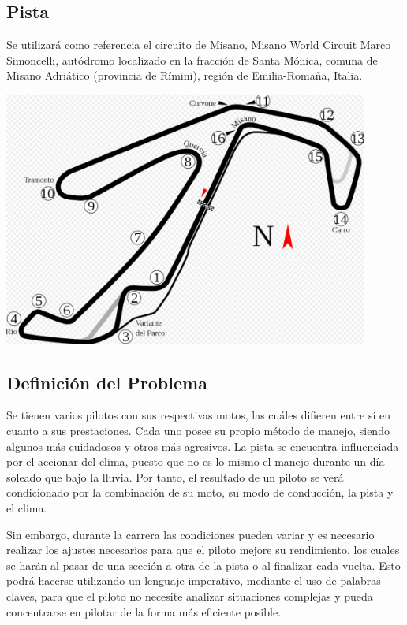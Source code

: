 \documentclass[12pt, letterpaper,spanish]{article}
\theoremstyle{definition}
\theoremstyle{remark}
\begin{document}
	\subsection{Pista}
	Se utilizará como referencia el circuito de Misano, Misano World Circuit Marco Simoncelli, autódromo localizado en la fracción de Santa Mónica, comuna de Misano Adriático (provincia de Rímini), región de Emilia-Romaña, Italia. 
	
	\begin{center}
		\includegraphics[width = 12cm]{circuito} 
	\end{center}

	\subsection{Definición del Problema}
	Se tienen varios pilotos con sus respectivas motos, las cuáles difieren entre sí en cuanto a sus prestaciones. Cada uno posee su propio método de manejo, siendo algunos más cuidadosos y otros más agresivos. La pista se encuentra influenciada por el accionar del clima, puesto que no es lo mismo el manejo durante un día soleado que bajo la lluvia. Por tanto, el resultado de un piloto se verá condicionado por la combinación de su moto, su modo de conducción, la pista y el clima.

	Sin embargo, durante la carrera las condiciones pueden variar y es necesario realizar los ajustes necesarios para que el piloto mejore su rendimiento, los cuales se harán al pasar de una sección a otra de la pista o al finalizar cada vuelta. Esto podrá hacerse utilizando un lenguaje imperativo, mediante el uso de palabras claves, para que el piloto no necesite analizar situaciones complejas y pueda concentrarse en pilotar de la forma más eficiente posible.
\end{document}

